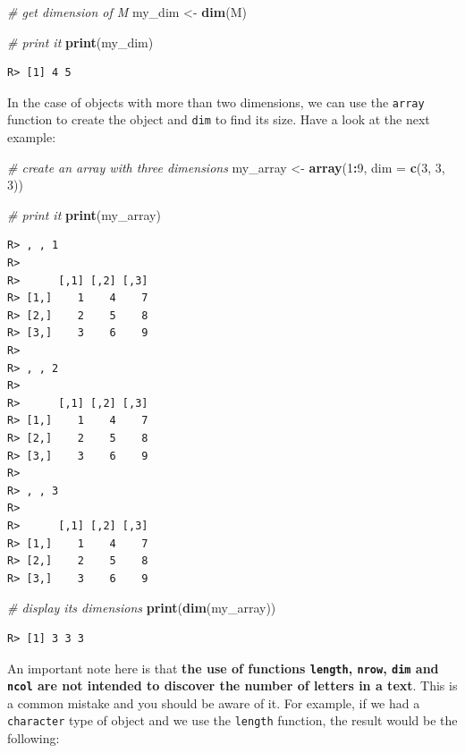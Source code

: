 \documentclass[
  12pt,
]{book}
\newenvironment{Shaded}{\begin{snugshade}}{\end{snugshade}}
\newcommand{\CommentTok}[1]{\textcolor[rgb]{0.37,0.37,0.37}{\textit{#1}}}
\newcommand{\DataTypeTok}[1]{\textcolor[rgb]{0.27,0.27,0.27}{#1}}
\newcommand{\DecValTok}[1]{\textcolor[rgb]{0.06,0.06,0.06}{#1}}
\newcommand{\KeywordTok}[1]{\textcolor[rgb]{0.27,0.27,0.27}{\textbf{#1}}}
\newcommand{\NormalTok}[1]{#1}
\newcommand{\OperatorTok}[1]{\textcolor[rgb]{0.43,0.43,0.43}{\textbf{#1}}}
\newcommand{\StringTok}[1]{\textcolor[rgb]{0.5,0.5,0.5}{#1}}
\begin{document}
\begin{Shaded}
\begin{Highlighting}[]
\CommentTok{# get dimension of M}
\NormalTok{my_dim <-}\StringTok{ }\KeywordTok{dim}\NormalTok{(M)}

\CommentTok{# print it}
\KeywordTok{print}\NormalTok{(my_dim)}
\end{Highlighting}
\end{Shaded}

\begin{verbatim}
R> [1] 4 5
\end{verbatim}

In the case of objects with more than two dimensions, we can use the \texttt{array} function to create the object and \texttt{dim} to find its size. Have a look at the next example:

\begin{Shaded}
\begin{Highlighting}[]
\CommentTok{# create an array with three dimensions}
\NormalTok{my_array <-}\StringTok{ }\KeywordTok{array}\NormalTok{(}\DecValTok{1}\OperatorTok{:}\DecValTok{9}\NormalTok{, }\DataTypeTok{dim =} \KeywordTok{c}\NormalTok{(}\DecValTok{3}\NormalTok{, }\DecValTok{3}\NormalTok{, }\DecValTok{3}\NormalTok{))}

\CommentTok{# print it}
\KeywordTok{print}\NormalTok{(my_array)}
\end{Highlighting}
\end{Shaded}

\begin{verbatim}
R> , , 1
R> 
R>      [,1] [,2] [,3]
R> [1,]    1    4    7
R> [2,]    2    5    8
R> [3,]    3    6    9
R> 
R> , , 2
R> 
R>      [,1] [,2] [,3]
R> [1,]    1    4    7
R> [2,]    2    5    8
R> [3,]    3    6    9
R> 
R> , , 3
R> 
R>      [,1] [,2] [,3]
R> [1,]    1    4    7
R> [2,]    2    5    8
R> [3,]    3    6    9
\end{verbatim}

\begin{Shaded}
\begin{Highlighting}[]
\CommentTok{# display its dimensions}
\KeywordTok{print}\NormalTok{(}\KeywordTok{dim}\NormalTok{(my_array))}
\end{Highlighting}
\end{Shaded}

\begin{verbatim}
R> [1] 3 3 3
\end{verbatim}

An important note here is that \textbf{the use of functions \texttt{length}, \texttt{nrow}, \texttt{dim} and \texttt{ncol} are not intended to discover the number of letters in a text}. This is a common mistake and you should be aware of it. For example, if we had a \texttt{character} type of object and we use the \texttt{length} function, the result would be the following:
\end{document}
